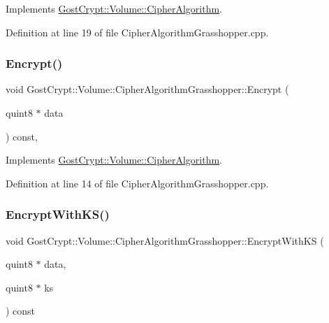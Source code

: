 Implements \hyperlink{class_gost_crypt_1_1_volume_1_1_cipher_algorithm_aa08e6b739411e759a0489668e818e08b}{Gost\+Crypt\+::\+Volume\+::\+Cipher\+Algorithm}.



Definition at line 19 of file Cipher\+Algorithm\+Grasshopper.\+cpp.

\mbox{\label{class_gost_crypt_1_1_volume_1_1_cipher_algorithm_grasshopper_a51c5a99186cd497ccc3ac318018ffc89}} 
\subsubsection{\texorpdfstring{Encrypt()}{Encrypt()}}
{\footnotesize\ttfamily void Gost\+Crypt\+::\+Volume\+::\+Cipher\+Algorithm\+Grasshopper\+::\+Encrypt (\begin{DoxyParamCaption}\item[{quint8 $\ast$}]{data }\end{DoxyParamCaption}) const\hspace{0.3cm}{\ttfamily [protected]}, {\ttfamily [virtual]}}



Implements \hyperlink{class_gost_crypt_1_1_volume_1_1_cipher_algorithm_a4e8eda4efa7393fa17be1f5dae6cc0e2}{Gost\+Crypt\+::\+Volume\+::\+Cipher\+Algorithm}.



Definition at line 14 of file Cipher\+Algorithm\+Grasshopper.\+cpp.

\mbox{\label{class_gost_crypt_1_1_volume_1_1_cipher_algorithm_grasshopper_addae3b81a7a30d4379f1874ca694b0a8}} 
\subsubsection{\texorpdfstring{Encrypt\+With\+K\+S()}{EncryptWithKS()}}
{\footnotesize\ttfamily void Gost\+Crypt\+::\+Volume\+::\+Cipher\+Algorithm\+Grasshopper\+::\+Encrypt\+With\+KS (\begin{DoxyParamCaption}\item[{quint8 $\ast$}]{data,  }\item[{quint8 $\ast$}]{ks }\end{DoxyParamCaption}) const\hspace{0.3cm}{\ttfamily [virtual]}}



